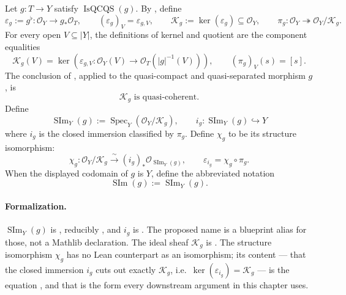 \begin{definition}
  \label{def:nagata-scheme-theoretic-image}
  \leanok

  Let \(g\colon T\to Y\) satisfy
  \(\operatorname{IsQCQS}(g)\).  By
  , define
  \[
    \varepsilon_g:=g^\flat\colon\mathcal O_Y\longrightarrow g_*\mathcal O_T,
    \qquad
    (\varepsilon_g)_V=\varepsilon_{g,V},
    \qquad
    \mathcal K_g:=\ker(\varepsilon_g)\subseteq\mathcal O_Y,
    \qquad
    \pi_g\colon\mathcal O_Y\twoheadrightarrow
      \mathcal O_Y/\mathcal K_g.
  \]
  For every open $V\subseteq|Y|$, the definitions of kernel and quotient are
  the component equalities
  \[
    \mathcal K_g(V)
      =\ker\!\left(
        \varepsilon_{g,V}\colon\mathcal O_Y(V)\to
        \mathcal O_T(|g|^{-1}(V))
      \right),
    \qquad
    (\pi_g)_V(s)=[s].
  \]
  The conclusion of
  \cite[\href{https://stacks.math.columbia.edu/tag/01R5}{Tag 01R5}]
  {stacks-project}, applied to the quasi-compact and quasi-separated morphism
  $g$, is
  \[
    \mathcal K_g\text{ is quasi-coherent}.
  \]
  Define
  \[
    \operatorname{SIm}_Y(g):=
      \operatorname{Spec}_Y(\mathcal O_Y/\mathcal K_g),
    \qquad
    i_g\colon\operatorname{SIm}_Y(g)\hookrightarrow Y
  \]
  where $i_g$ is the closed immersion classified by $\pi_g$.  Define
  $\chi_g$ to be its structure isomorphism:
  \[
    \chi_g\colon\mathcal O_Y/\mathcal K_g
      \xrightarrow{\ \sim\ }(i_g)_*
      \mathcal O_{\operatorname{SIm}_Y(g)},
    \qquad
    \varepsilon_{i_g}=\chi_g\circ\pi_g.
  \]
  When the displayed codomain of $g$ is $Y$, define the abbreviated notation
  \[
    \operatorname{SIm}(g):=\operatorname{SIm}_Y(g).
  \]

  \paragraph{Formalization.}
  $\operatorname{SIm}_Y(g)$ is \texttt{},
  reducibly \texttt{}, and $i_g$ is
  \texttt{}.  The proposed name
  \texttt{} is a blueprint alias for those, not a
  Mathlib declaration.  The ideal sheaf $\mathcal K_g$ is
  \texttt{}.  The structure isomorphism $\chi_g$ has no Lean
  counterpart as an isomorphism; its content --- that the closed immersion $i_g$ cuts out
  exactly $\mathcal K_g$, i.e.\ $\ker(\varepsilon_{i_g})=\mathcal K_g$ --- is the equation
  \texttt{}, and that is the form every
  downstream argument in this chapter uses.


\end{definition}
